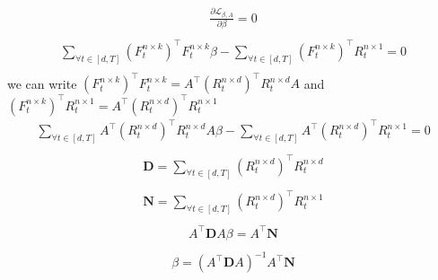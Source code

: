 \begin{equation}\label{expaned_bets_diff_loss}
\begin{aligned}
    \frac{\partial \mathcal{L}_{\beta, A}}{\partial \beta} = 0\\
\end{aligned}
\end{equation}
\begin{equation}
\begin{aligned}
    \sum_{\forall t\in [d,T]} (F^{n\times k}_t)^\top F^{n\times k}_t \beta - \sum_{\forall t\in [d,T]} (F^{n\times k}_t)^\top R^{n\times 1}_t = 0\\
\end{aligned}
\end{equation}
we can write $(F^{n\times k}_t)^\top F^{n\times k}_t = A^\top(R^{n\times d}_{t})^\top R^{n\times d}_{t} A$ and $(F^{n\times k}_t)^\top R^{n\times 1}_{t} = A^\top(R^{n\times d}_{t})^\top R^{n\times 1}_{t}$
\begin{equation}\label{dk2_complexity_method_for_regg}
\begin{aligned} 
    \sum_{\forall t\in [d,T]} A^\top (R^{n\times d}_t)^\top R^{n\times d}_t A \beta - \sum_{\forall t\in [d,T]} A^\top (R^{n\times d}_t)^\top R^{n\times 1}_t = 0\\
\end{aligned}
\end{equation}
\begin{equation}
\begin{aligned}
    \mathbf{D} = \sum_{\forall t\in [d,T]} (R^{n\times d}_t)^\top R^{n\times d}_t\\
\end{aligned}
\end{equation}
\begin{equation}
\begin{aligned}
     \mathbf{N} = \sum_{\forall t\in [d,T]} (R^{n\times d}_t)^\top R^{n\times 1}_t\\
\end{aligned}
\end{equation}
\begin{equation}
\begin{aligned}
    A^\top \mathbf{D} A \beta = A^\top \mathbf{N}\\
\end{aligned}
\end{equation}
\begin{equation}
\begin{aligned} \label{regg_full_linalg_formula}
    \beta = (A^\top \mathbf{D} A)^{-1} A^\top \mathbf{N}
\end{aligned}
\end{equation}
